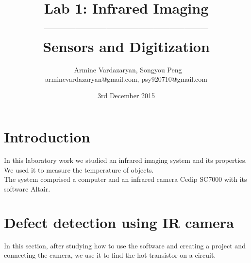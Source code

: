 \documentclass[english]{article}
\begin{document}
\title{Lab 1: Infrared Imaging\\ -------------------------------- \\ \Large Sensors and Digitization}
\author{ \ Armine Vardazaryan, Songyou Peng \\ arminevardazaryan@gmail.com, psy920710@gmail.com}
\date{3rd December 2015}

\maketitle

\section{Introduction}
In this laboratory work we studied an infrared imaging system and its properties. 
We used it to measure the temperature of objects. \\
The system comprised a computer and an infrared camera Cedip SC7000 with its software Altair.\\
\section{Defect detection using IR camera}
In this section, after studying how to use the software and creating a project and connecting the camera, we use it to find the hot transistor on a circuit.\\
\end{document}
